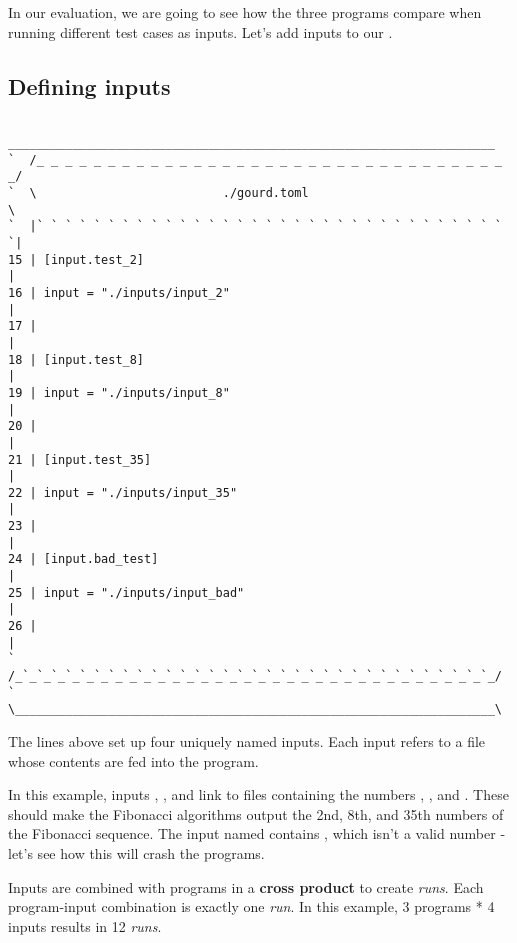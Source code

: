 \documentclass[a4paper,english]{article}
\begin{document}
\begin{adjustwidth}{18pt}{0pt}
    In our evaluation, we are going to see how the three programs compare when
    running different test cases as inputs.
    Let's add inputs to our .

    \subsection{Defining inputs}

    \begin{verbatim}
    ____________________________________________________________________
`  /_ _ _ _ _ _ _ _ _ _ _ _ _ _ _ _ _ _ _ _ _ _ _ _ _ _ _ _ _ _ _ _ _ _/
`  \                          ./gourd.toml                             \
`  |` ` ` ` ` ` ` ` ` ` ` ` ` ` ` ` ` ` ` ` ` ` ` ` ` ` ` ` ` ` ` ` ` `|
15 | [input.test_2]                                                    |
16 | input = "./inputs/input_2"                                        |
17 |                                                                   |
18 | [input.test_8]                                                    |
19 | input = "./inputs/input_8"                                        |
20 |                                                                   |
21 | [input.test_35]                                                   |
22 | input = "./inputs/input_35"                                       |
23 |                                                                   |
24 | [input.bad_test]                                                  |
25 | input = "./inputs/input_bad"                                      |
26 |                                                                   |
`  /_`_`_`_`_`_`_`_`_`_`_`_`_`_`_`_`_`_`_`_`_`_`_`_`_`_`_`_`_`_`_`_`_`_/
`  \___________________________________________________________________\

    \end{verbatim}

    The lines above set up four uniquely named inputs.
    Each input refers to a file whose contents are fed into the program.

    In this example, inputs , , and 
    link to files containing the numbers \File{2}, \File{8}, and \File{35}.
    These should make the Fibonacci algorithms output the 2nd, 8th, and 35th
    numbers of the Fibonacci sequence.
    The input named  contains , which isn't
    a valid number - let's see how this will crash the programs.

    Inputs are combined with programs in a \textbf{cross product} to create
    \emph{runs}. Each program-input combination is exactly one \emph{run}.
    In this example, 3 programs * 4 inputs results in 12 \emph{runs}.


\end{adjustwidth}
\end{document}
